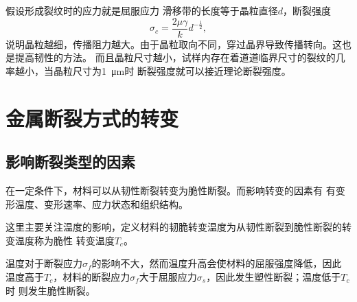             假设形成裂纹时的应力就是屈服应力 滑移带的长度等于晶粒直径$d$，断裂强度
            \begin{equation}
                \sigma_c=\frac{2\mu\gamma}{k} d^{-\frac{1}{2}},
            \end{equation}
            说明晶粒越细，传播阻力越大。由于晶粒取向不同，穿过晶界导致传播转向。这也是提高韧性的方法。
            而且晶粒尺寸越小，试样内存在着道道临界尺寸的裂纹的几率越小，当晶粒尺寸为\SI{1}{\micro\m}时
            断裂强度就可以接近理论断裂强度。
    \section{金属断裂方式的转变}
        \subsection{影响断裂类型的因素}
            在一定条件下，材料可以从韧性断裂转变为脆性断裂。而影响转变的因素有
            有变形温度、变形速率、应力状态和组织结构。

            这里主要关注温度的影响，定义材料的韧脆转变温度为从韧性断裂到脆性断裂的转变温度称为脆性
            转变温度$T_c$。
            
            温度对于断裂应力$\sigma_f$的影响不大，然而温度升高会使材料的屈服强度降低，因此
            温度高于$T_c$，材料的断裂应力$\sigma_f$大于屈服应力$\sigma_s$，因此发生塑性断裂；温度低于$T_c$时
            则发生脆性断裂。
        
            